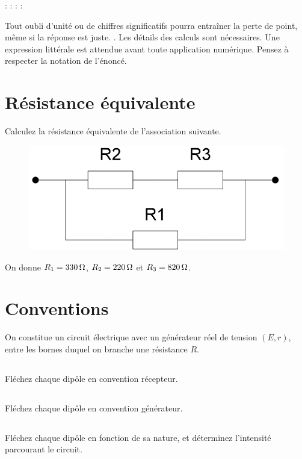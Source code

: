 \documentclass[10pt,a4paper]{article}
\begin{document}
\noindent {} : \hfill {} : \hfill {} : \hfill {} :
\hspace*{3em}\bigbreak

Tout oubli d’unité ou de chiffres significatifs pourra entraîner la perte de
point, même si la réponse est juste. . Les détails des calculs sont nécessaires. Une expression littérale
est attendue avant toute application numérique. Pensez à respecter la notation
de l'énoncé.

\section{Résistance équivalente}
Calculez la résistance équivalente de l'association suivante.
\begin{figure}[htbp!]
    \centering
    \includegraphics[width=.3\linewidth]{Req1.png}
    \captionsetup{justification=centering}
\end{figure}

On donne $R_1 = \SI{330}{\Omega}$, $R_2 = \SI{220}{\Omega}$ et $R_3 = \SI{820}{\Omega}$.

\vfill

\section{Conventions}
\noindent On constitue un circuit électrique avec un générateur réel de tension
$(E, r)$, entre les bornes duquel on branche une résistance $R$.

\subsection{}Fléchez chaque dipôle en convention récepteur.
\vspace{3cm}
\subsection{}Fléchez chaque dipôle en convention générateur.
\vspace{3cm}
\subsection{}Fléchez chaque dipôle en fonction de sa nature, et déterminez
l'intensité parcourant le circuit.
\vspace{3cm}
\end{document}
